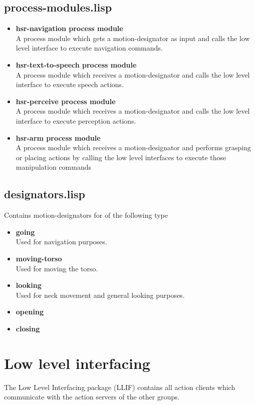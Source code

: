 \documentclass[main.tex]{subfiles}
\begin{document}
	    \subsection{process-modules.lisp}
	     \begin{itemize}
		\label{pcm}
	    	\item \textbf{hsr-navigation process module} \\
		A process module which gets a motion-designator as input and calls the low level interface to execute navigation commands.
		\item \textbf{hsr-text-to-speech process module} \\
		A process module which receives a motion-designator and calls the low level interface to execute speech actions.
		\item \textbf{hsr-perceive process module} \\
		A process module which receives a motion-designator and calls the low level interface to execute perception actions.
		\item\textbf{hsr-arm process module} \\
		A process module which receives a motion-designator and performs grasping or placing actions by calling the low level interfaces to execute those manipulation commands 
	    \end{itemize}
	    \subsection{designators.lisp}
	    Contains motion-designators for of the following type
	    \begin{itemize}
		\label{desig}
	    	\item \textbf{going} \\
		Used for navigation purposes.
		\item \textbf{moving-torso} \\
		Used for moving the torso.
		\item \textbf{looking} \\
		Used for neck movement and general looking purposes.
		\item \textbf{opening} \\
		
		\item \textbf{closing} \\
	    \end{itemize}

	  	\section{Low level interfacing}
	  	\label{llif}
		The Low Level Interfacing package (LLIF) contains all action clients which communicate with the action servers of the other groups.
\end{document}
